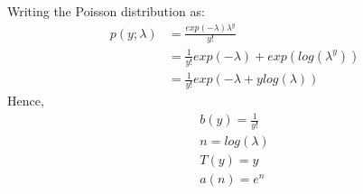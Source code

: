 \begin{answer}
    Writing the Poisson distribution as:
    $$
    \begin{aligned}
        p(y;\lambda) &= \frac{exp(-\lambda)\lambda^{y}}{y!}\\
        &= \frac{1}{y!}exp(-\lambda) + exp(log(\lambda^y))\\
        &= \frac{1}{y!}exp(-\lambda + ylog(\lambda))
    \end{aligned}
    $$
    Hence,
    $$
    \begin{aligned}
        b(y) = \frac{1}{y!}\\
        n = log(\lambda)\\
        T(y) = y\\
        a(n) = e^n
    \end{aligned}
    $$
\end{answer}
